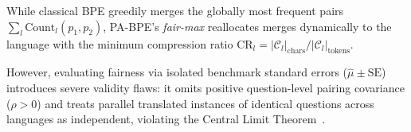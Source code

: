 While classical BPE greedily merges the globally most frequent pairs $\sum_l \mathrm{Count}_l(p_1, p_2)$, PA-BPE's \textit{fair-max} reallocates merges dynamically to the language with the minimum compression ratio $\mathrm{CR}_l = |\mathcal{C}_l|_{\mathrm{chars}} / |\mathcal{C}_l|_{\mathrm{tokens}}$. 

However, evaluating fairness via isolated benchmark standard errors ($\hat{\mu} \pm \mathrm{SE}$) introduces severe validity flaws: it omits positive question-level pairing covariance ($\rho > 0$) and treats parallel translated instances of identical questions across languages as independent, violating the Central Limit Theorem~\cite{miller2024adding}.
